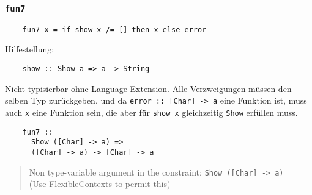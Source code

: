 \documentclass{beamer}
\begin{document}
\begin{frame}[fragile]
  \frametitle{\lstinline{fun7}}
  \begin{lstlisting}
    fun7 x = if show x /= [] then x else error
  \end{lstlisting}
  \pause
  Hilfestellung:
  \begin{lstlisting}
    show :: Show a => a -> String
  \end{lstlisting}
  \pause
  Nicht typisierbar ohne Language Extension.
  Alle Verzweigungen müssen den selben Typ zurückgeben,
  und da \lstinline{error :: [Char] -> a} eine Funktion ist,
  muss auch \lstinline{x} eine Funktion sein,
  die aber für \lstinline{show x} gleichzeitig \lstinline{Show} erfüllen muss.
  \begin{lstlisting}
    fun7 ::
      Show ([Char] -> a) =>
      ([Char] -> a) -> [Char] -> a
  \end{lstlisting}
  \begin{quote}
    Non type-variable argument in the constraint: \lstinline{Show ([Char] -> a)} \\
    (Use FlexibleContexts to permit this)
  \end{quote}
\end{frame}
\end{document}
